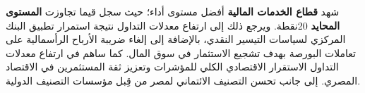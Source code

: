 شهد \textbf{قطاع الخدمات المالية} أفضل مستوى أداء؛ حيث سجل قيما تجاوزت \textbf{المستوى المحايد} 20نقطة. ويرجع ذلك إلى ارتفاع معدلات التداول نتيجة استمرار تطبيق البنك المركزي لسياسات التيسير النقدي، بالإضافة إلى إلغاء ضريبة الأرباح الرأسمالية على تعاملات البورصة بهدف تشجيع الاستثمار في سوق المال. كما ساهم في ارتفاع معدلات التداول الاستقرار الاقتصادي الكلي للمؤشرات وتعزيز ثقة المستثمرين في الاقتصاد المصري. إلى جانب تحسن التصنيف الائتماني لمصر من قِبل مؤسسات التصنيف الدولية.
